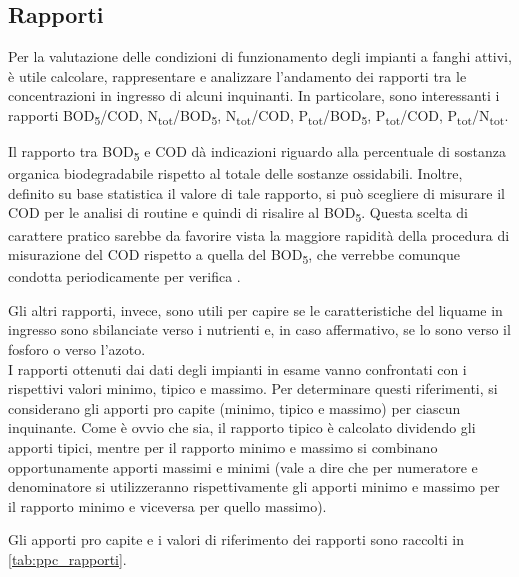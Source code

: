 \subsection{Rapporti}
\label{subsec:rapporti}
Per la valutazione delle condizioni di funzionamento degli impianti a fanghi attivi, è utile calcolare, rappresentare e analizzare l'andamento dei rapporti tra le concentrazioni in ingresso di alcuni inquinanti.
In particolare, sono interessanti i rapporti BOD\textsubscript{5}/COD, N\textsubscript{tot}/BOD\textsubscript{5}, N\textsubscript{tot}/COD, P\textsubscript{tot}/BOD\textsubscript{5}, P\textsubscript{tot}/COD, P\textsubscript{tot}/N\textsubscript{tot}.

Il rapporto tra BOD\textsubscript{5} e COD dà indicazioni riguardo alla percentuale di sostanza organica biodegradabile rispetto al totale delle sostanze ossidabili. Inoltre, definito su base statistica il valore di tale rapporto, si può scegliere di misurare il COD per le analisi di routine e quindi di risalire al BOD\textsubscript{5}. Questa scelta di carattere pratico sarebbe da favorire vista la maggiore rapidità della procedura di misurazione del COD rispetto a quella del BOD\textsubscript{5}, che verrebbe comunque condotta periodicamente per verifica \cite{bonomo2008trattamenti}.

Gli altri rapporti, invece, sono utili per capire se le caratteristiche del liquame in ingresso sono sbilanciate verso i nutrienti e, in caso affermativo, se lo sono verso il fosforo o verso l'azoto.\\

I rapporti ottenuti dai dati degli impianti in esame vanno confrontati con i rispettivi valori minimo, tipico e massimo. Per determinare questi riferimenti, si considerano gli apporti pro capite (minimo, tipico e massimo) per ciascun inquinante. Come è ovvio che sia, il rapporto tipico è calcolato dividendo gli apporti tipici, mentre per il rapporto minimo e massimo si combinano opportunamente apporti massimi e minimi (vale a dire che per numeratore e denominatore si utilizzeranno rispettivamente gli apporti minimo e massimo per il rapporto minimo e viceversa per quello massimo).

Gli apporti pro capite e i valori di riferimento dei rapporti sono raccolti in \autoref{tab:ppc_rapporti}.

